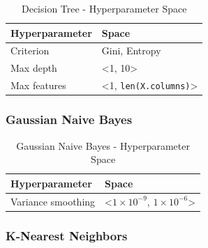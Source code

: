 \begin{table}[H]
    \small
    \setlength{\tabcolsep}{8pt}
    \renewcommand{\arraystretch}{1.3}
    \centering
        \caption[Decision Tree - Hyperparameter Space]{Decision Tree - Hyperparameter Space}\label{tab:dtspace}
        \begin{tabular}{ll}
    \toprule
    \textbf{Hyperparameter} & \textbf{Space}\\
    \midrule
    \hline
    Criterion & Gini, Entropy \\
    Max depth & <1, 10> \\
    Max features & <1, \verb|len(X.columns)|>  \\
    \hline
    \bottomrule
    \end{tabular}
    \vspace{0.7em}

    \vspace{-1em}
\end{table}

\subsubsection{Gaussian Naive Bayes}

\begin{table}[H]
    \small
    \setlength{\tabcolsep}{8pt}
    \renewcommand{\arraystretch}{1.3}
    \centering
        \caption[Gaussian Naive Bayes - Hyperparameter Space]{Gaussian Naive Bayes  - Hyperparameter Space}\label{tab:gnbspace}
        \begin{tabular}{ll}
    \toprule
    \textbf{Hyperparameter} & \textbf{Space}\\
    \midrule
    \hline
    Variance smoothing & <$1\times 10^{-9}$, $1\times 10^{-6}$> \\
    \hline
    \bottomrule
    \end{tabular}
    \vspace{0.7em}

    \vspace{-1em}
\end{table}



\subsubsection{K-Nearest Neighbors}


